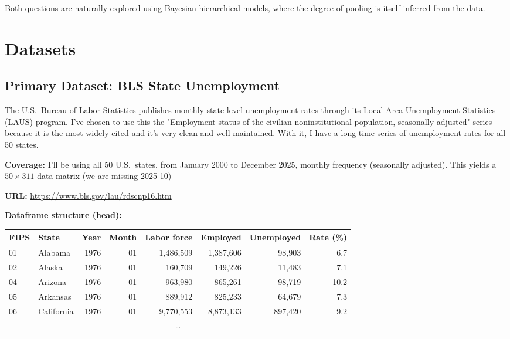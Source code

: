 \documentclass[11pt]{article}
\begin{document}
Both questions are naturally explored using Bayesian hierarchical models,
where the degree of pooling is itself inferred from the data.

\section{Datasets}

\subsection{Primary Dataset: BLS State Unemployment}

The U.S.\ Bureau of Labor Statistics publishes monthly state-level
unemployment rates through its Local Area Unemployment Statistics (LAUS)
program. I've chosen to use this the "Employment status of the civilian noninstitutional population, seasonally adjusted" series
because it is the most widely cited and it's very clean and well-maintained. With it, I have 
a long time series of unemployment rates for all 50 states.

\textbf{Coverage:} I'll be using all 50 U.S.\ states, from January 2000 to December 2025,
monthly frequency (seasonally adjusted). This yields a $50 \times 311$
data matrix (we are missing 2025-10)

\textbf{URL:} \url{https://www.bls.gov/lau/rdscnp16.htm}

\medskip
\noindent\textbf{Dataframe structure (head):}

\begin{center}
\small
\begin{tabular}{llrrrrrr}
  \toprule
  \textbf{FIPS} & \textbf{State} & \textbf{Year} & \textbf{Month} 
    & \textbf{Labor force} & \textbf{Employed} & \textbf{Unemployed} & \textbf{Rate (\%)} \\
  \midrule
  01 & Alabama    & 1976 & 01 & 1,486,509 & 1,387,606 & 98,903  & 6.7 \\
  02 & Alaska     & 1976 & 01 &   160,709 &   149,226 & 11,483  & 7.1 \\
  04 & Arizona    & 1976 & 01 &   963,980 &   865,261 & 98,719  & 10.2 \\
  05 & Arkansas   & 1976 & 01 &   889,912 &   825,233 & 64,679  & 7.3 \\
  06 & California & 1976 & 01 & 9,770,553 & 8,873,133 & 897,420 & 9.2 \\
  \multicolumn{8}{c}{\ldots} \\
  \bottomrule
\end{tabular}
\end{center}
\end{document}
